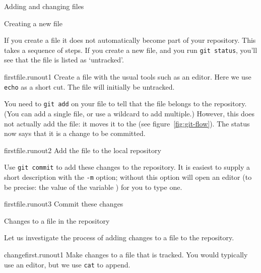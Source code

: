 \newpage
{} {Adding and changing files}
\label{sec:hg-push}

 {Creating a new file}

If you create a file it does not automatically become part of your repository.
This takes a sequence of steps.
If you create a new file, and you run \lstinline{git status},
you'll see that the file is listed as `untracked'.

\begin{gitstep}{firstfile.runout1}
  Create a file with the usual tools such as an editor.
  Here we use \lstinline{echo} as a short cut.
  The file will initially be untracked.
\end{gitstep}

You need to \lstinline{git add} on your file to tell  that the file
belongs to the repository.
(You can add a single file, or use a wildcard to add multiple.)
However, this does not actually add the file:
it moves it to the 
(see figure~\ref{fig:git-flow}).
The status now says that it is a change to be committed.

\begin{gitstep}{firstfile.runout2}
  Add the file to the local repository
\end{gitstep}

Use \lstinline{git commit} to add these changes to the repository.
It is easiest to supply a short description with the \lstinline{-m} option;
without this option  will open an editor
(to be precise: the value of the variable )
for you to type one.

\begin{gitstep}{firstfile.runout3}
  Commit these changes
\end{gitstep}

\newpage
{} {Changes to a file in the repository}

Let us investigate the process of adding changes to a file to the repository.

\begin{gitstep}{changefirst.runout1}
  Make changes to a file that is tracked.
  You would typically use an editor, but we use \lstinline{cat} to append.
\end{gitstep}

